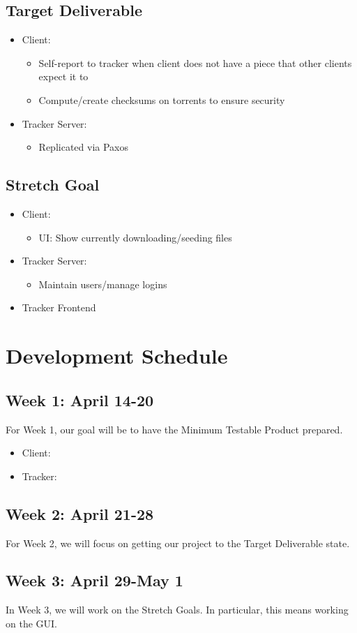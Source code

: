 \documentclass[11pt]{article}
\begin{document}
\subsection*{Target Deliverable}
\begin{itemize}
\item  Client:
    \begin{itemize}
    \item  Self-report to tracker when client does not have a piece that other clients expect it to
    \item  Compute/create checksums on torrents to ensure security
    \end{itemize}
\item  Tracker Server:
    \begin{itemize}
    \item  Replicated via Paxos
    \end{itemize}
\end{itemize}

\subsection*{Stretch Goal}
\begin{itemize}
\item  Client:
    \begin{itemize}
    \item  UI: Show currently downloading/seeding files
    \end{itemize}
\item  Tracker Server:
    \begin{itemize}
    \item  Maintain users/manage logins
    \end{itemize}
\item  Tracker Frontend
\end{itemize}

\section*{Development Schedule}

\subsection*{Week 1: April 14-20}
For Week 1, our goal will be to have the Minimum Testable Product prepared.
\begin{itemize}
\item  Client:
\item  Tracker:
\end{itemize}

\subsection*{Week 2: April 21-28}
For Week 2, we will focus on getting our project to the Target Deliverable state.

\subsection*{Week 3: April 29-May 1}
In Week 3, we will work on the Stretch Goals.
In particular, this means working on the GUI.
\end{document}
